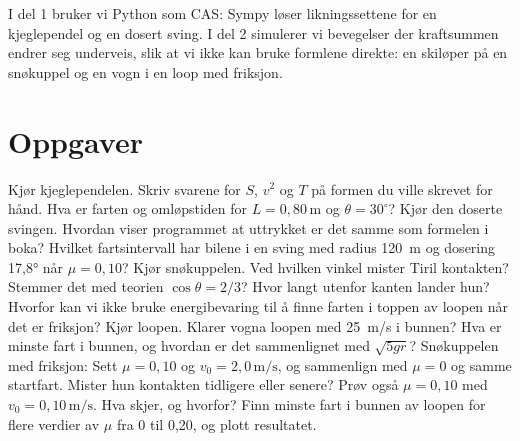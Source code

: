 \documentclass[11pt]{article}
\begin{document}

I del 1 bruker vi Python som CAS: Sympy løser likningssettene for en kjeglependel og en dosert sving. I del 2 simulerer vi bevegelser der kraftsummen endrer seg underveis, slik at vi ikke kan bruke formlene direkte: en skiløper på en snøkuppel og en vogn i en loop med friksjon.

\section*{Oppgaver}

\begin{oppgaveliste}
\oppgave {}Kjør kjeglependelen. Skriv svarene for $S$, $v^{2}$ og $T$ på formen du ville skrevet for hånd. Hva er farten og omløpstiden for $L = 0{,}80\,\mathrm{m}$ og $θ = 30^{\circ}$?
\svar
\oppgave {}Kjør den doserte svingen. Hvordan viser programmet at uttrykket er det samme som formelen i boka? Hvilket fartsintervall har bilene i en sving med radius 120~m og dosering 17,8° når $μ = 0{,}10$?
\svar
\oppgave {}Kjør snøkuppelen. Ved hvilken vinkel mister Tiril kontakten? Stemmer det med teorien $\cos  θ = 2/3$? Hvor langt utenfor kanten lander hun?
\svar
\oppgave {}Hvorfor kan vi ikke bruke energibevaring til å finne farten i toppen av loopen når det er friksjon?
\svar
\oppgave {}Kjør loopen. Klarer vogna loopen med 25~m/s i bunnen? Hva er minste fart i bunnen, og hvordan er det sammenlignet med $\sqrt{5gr}$?
\svar
\oppgave {}Snøkuppelen med friksjon: Sett $μ = 0{,}10$ og $v_{0} = 2{,}0\,\mathrm{m/s}$, og sammenlign med $μ = 0$ og samme startfart. Mister hun kontakten tidligere eller senere? Prøv også $μ = 0{,}10$ med $v_{0} = 0{,}10\,\mathrm{m/s}$. Hva skjer, og hvorfor?
\svar
\oppgave {}Finn minste fart i bunnen av loopen for flere verdier av $μ$ fra 0 til 0,20, og plott resultatet.
\svar
\end{oppgaveliste}
\end{document}
